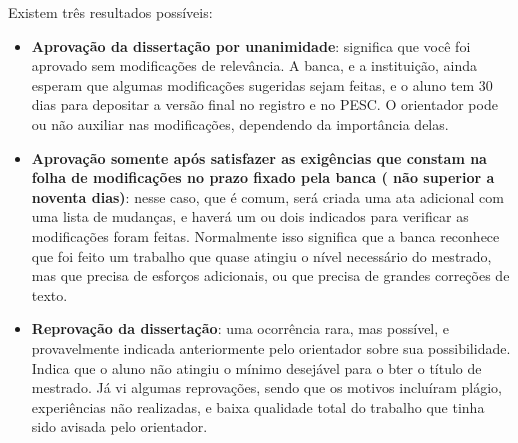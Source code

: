Existem três resultados possíveis:
\begin{itemize}
    \item \textbf{Aprovação da dissertação por unanimidade}: significa que você foi aprovado sem modificações de relevância. A banca, e a instituição, ainda esperam que algumas modificações sugeridas sejam feitas, e o aluno tem 30 dias para depositar a versão final no registro e no PESC. O orientador pode ou não auxiliar nas modificações, dependendo da importância delas.
    \item \textbf{Aprovação  somente  após  satisfazer  as  exigências que constam 	 na  folha  de   modificações  no  prazo   fixado  pela  banca    ( não superior  a   noventa   dias)}: nesse caso, que é comum, será criada uma ata adicional com uma lista de mudanças, e haverá um ou dois indicados para verificar as modificações foram feitas. Normalmente isso significa que a banca reconhece que foi feito um trabalho que quase atingiu o nível necessário do mestrado, mas que precisa de esforços adicionais, ou que precisa de grandes correções de texto.
    \item \textbf{Reprovação da dissertação}: uma ocorrência rara, mas possível, e provavelmente indicada anteriormente pelo orientador sobre sua possibilidade. Indica que o aluno não atingiu o mínimo desejável para o bter o título de mestrado. Já vi algumas reprovações, sendo que os motivos incluíram plágio, experiências não realizadas, e baixa qualidade total do trabalho que tinha sido avisada pelo orientador.
\end{itemize}






